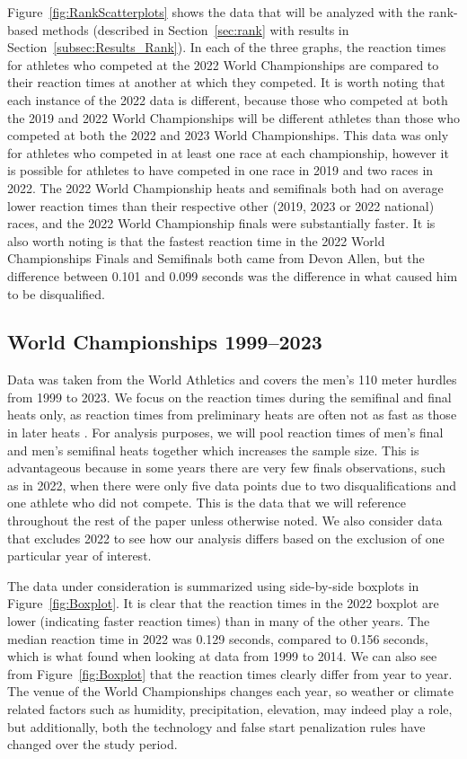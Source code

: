 \documentclass[12pt, letterpaper, titlepage]{article}
\begin{document}
Figure~\ref{fig:RankScatterplots} shows the data that will be analyzed
with the rank-based methods (described in Section~\ref{sec:rank} with results in 
Section~\ref{subsec:Results_Rank}). In each of the three graphs, the reaction 
times for athletes who competed at the 2022 World Championships
are compared to their reaction times at another at which they competed. 
It is worth noting that each instance of the 2022 data is different, because
those who competed at both the 2019 and 2022 World Championships will be
different athletes than those who competed at both the 2022 and 2023 World
Championships. This data was only for athletes who competed
in at least one race at each championship, however it is possible for athletes
to have competed in one race in 2019 and two races in 2022. The 2022 World
Championship heats and semifinals both had on average lower reaction times than
their respective other (2019, 2023 or 2022 national) races, and the 2022 World 
Championship finals were substantially faster.  It
is also worth noting is that the fastest reaction time in the 2022 World
Championships Finals and Semifinals both came from Devon Allen, but the 
difference between 0.101 and 0.099
seconds was the difference in what caused him to be disqualified. 


\subsection{World Championships 1999--2023}\label{sec:dataworld}


Data was taken from the World Athletics 
and covers the men's 110 meter hurdles from 1999 to 2023.
We focus on the reaction times during the 
semifinal and final heats only, as reaction times from preliminary heats are 
often not as fast as those in later heats \citep[e.g.,][]{zhang2021correlation}. 
For analysis purposes, we will pool reaction times of men's final and 
men's semifinal heats together which increases the sample size. This is 
advantageous because in some years there are very few finals observations, such
as in 2022, when there were only five data points due to two disqualifications 
and one athlete who did not compete. This is the data that we will reference
throughout the rest of the paper unless otherwise noted. We also consider data 
that excludes 2022 to see how our analysis differs based on the exclusion of one
particular year of interest.


The data under consideration is summarized using side-by-side boxplots in 
Figure~\ref{fig:Boxplot}. It is clear that the reaction times in the 2022
boxplot are lower (indicating faster reaction times) than in many of the other
years. The median reaction time in 2022 was 0.129 seconds,  compared to 0.156
seconds, which is what \citet{brosnan2017effects} found when looking at data
from 1999 to 2014. We can also see from Figure~\ref{fig:Boxplot} that the 
reaction times clearly differ from year to year. The venue of the World 
Championships changes each year, so weather or climate related factors such as 
humidity, precipitation, elevation, may indeed play a role, but additionally,
both the technology and false start penalization rules have changed over the 
study period.
\end{document}
